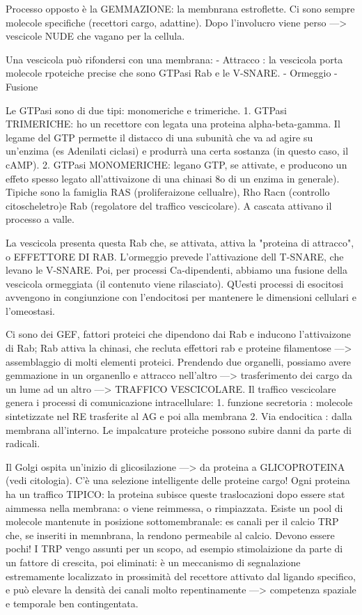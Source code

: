 \documentclass[a4paper,12pt]{article}
\begin{document}
Processo opposto è la GEMMAZIONE: la membnrana estroflette. Ci sono sempre molecole specifiche (recettori cargo, adattine). Dopo l'involucro viene perso ---> vescicole NUDE che vagano per la cellula.

Una vescicola può rifondersi con una membrana: 
- Attracco : la vescicola porta molecole rpoteiche precise che sono GTPasi Rab e le V-SNARE.
- Ormeggio
- Fusione

Le GTPasi sono di due tipi: monomeriche e trimeriche.
1. GTPasi TRIMERICHE: ho un recettore con legata una proteina alpha-beta-gamma. Il legame del GTP permette il distacco di una subunità che va ad agire su un'enzima (es Adenilati ciclasi) e produrrà una certa sostanza (in questo caso, il cAMP).
2. GTPasi MONOMERICHE: legano GTP, se attivate, e producono un effeto spesso legato all'attivaizone di una chinasi 8o di un enzima in generale). Tipiche sono la famiglia RAS (proliferaizone cellualre), Rho Racn (controllo citoscheletro)e Rab (regolatore del traffico vescicolare). A cascata attivano il processo a valle.

La vescicola presenta questa Rab che, se attivata, attiva la "proteina di attracco", o EFFETTORE DI RAB. L'ormeggio prevede l'attivazione dell T-SNARE, che levano le V-SNARE. Poi, per processi Ca-dipendenti, abbiamo una fusione della vescicola ormeggiata (il contenuto viene rilasciato).
QUesti processi di esocitosi avvengono in congiunzione con l'endocitosi per mantenere le dimensioni cellulari e l'omeostasi.

Ci sono dei GEF, fattori proteici che dipendono dai Rab e inducono l'attivaizone di Rab; Rab attiva la chinasi, che recluta effettori rab e proteine filamentose ---> assemblaggio di molti elementi proteici.
Prendendo due organelli, possiamo avere gemmazione in un organenllo e attracco nell'altro ---> trasferimento dei cargo da un lume ad un altro ---> TRAFFICO VESCICOLARE.
Il traffico vescicolare genera i processi di comunicazione intracellulare:
1. funzione secretoria : molecole sintetizzate nel RE trasferite al AG e poi alla membrana
2. Via endocitica : dalla membrana all'interno. Le impalcature proteiche possono subire danni da parte di radicali.

Il Golgi ospita un'inizio di glicosilazione ---> da proteina a GLICOPROTEINA (vedi citologia). C'è una selezione intelligente delle proteine cargo!
Ogni proteina ha un traffico TIPICO: la proteina subisce queste traslocazioni dopo essere stat aimmessa nella membrana: o viene reimmessa, o rimpiazzata. 
Esiste un pool di molecole mantenute in posizione sottomembranale: es canali per il calcio TRP che, se inseriti in memnbrana, la rendono permeabile al calcio. Devono essere pochi! I TRP vengo assunti per un scopo, ad esempio stimolaizione da parte di un fattore di crescita, poi eliminati: è un meccanismo di segnalazione estremamente localizzato in prossimità del recettore attivato dal ligando specifico, e può elevare la densità dei canali molto repentinamente ---> competenza spaziale e temporale ben contingentata. 
\end{document}
